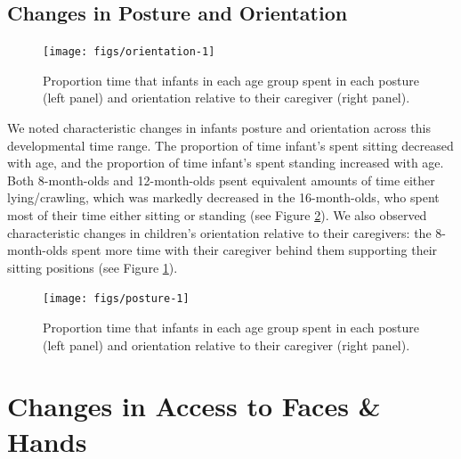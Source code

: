 \documentclass[10pt, letterpaper]{article}
\newenvironment{CodeChunk}{}{}
\begin{document}
\subsection{Changes in Posture and
Orientation}\label{changes-in-posture-and-orientation}

\begin{CodeChunk}
\begin{figure}[h]

{\centering \texttt{[image: figs/orientation-1]} 

}

\caption[Proportion time that infants in each age group spent in each posture (left panel) and orientation relative to their caregiver (right  panel)]{Proportion time that infants in each age group spent in each posture (left panel) and orientation relative to their caregiver (right  panel).}\label{fig:orientation}
\end{figure}
\end{CodeChunk}

We noted characteristic changes in infants posture and orientation
across this developmental time range. The proportion of time infant's
spent sitting decreased with age, and the proportion of time infant's
spent standing increased with age. Both 8-month-olds and 12-month-olds
psent equivalent amounts of time either lying/crawling, which was
markedly decreased in the 16-month-olds, who spent most of their time
either sitting or standing (see Figure \ref{fig:posture}). We also
observed characteristic changes in children's orientation relative to
their caregivers: the 8-month-olds spent more time with their caregiver
behind them supporting their sitting positions (see Figure
\ref{fig:orientation}).

\begin{CodeChunk}
\begin{figure}[h]

{\centering \texttt{[image: figs/posture-1]} 

}

\caption[Proportion time that infants in each age group spent in each posture (left panel) and orientation relative to their caregiver (right  panel)]{Proportion time that infants in each age group spent in each posture (left panel) and orientation relative to their caregiver (right  panel).}\label{fig:posture}
\end{figure}
\end{CodeChunk}

\section{Changes in Access to Faces \&
Hands}\label{changes-in-access-to-faces-hands}
\end{document}
